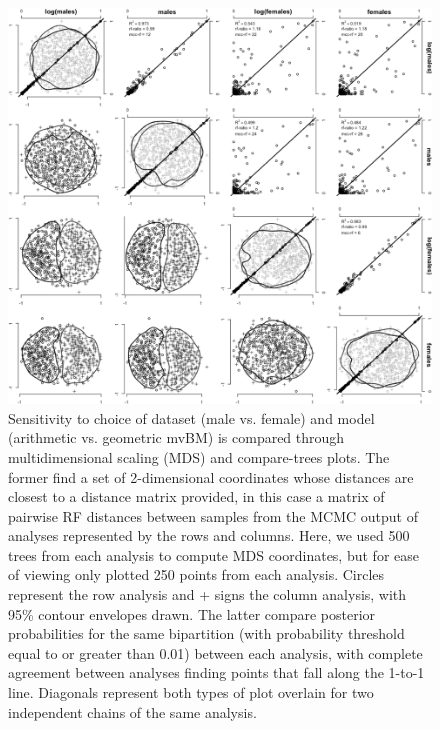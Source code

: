 \begin{figure}[h]
\centering
\includegraphics[width=140mm]{figures/sensitivityHowells.png}
\caption[Visualizing Sensitivity to Researcher Degrees of Freedom in Analysis of Howells' Data]{Sensitivity to choice of dataset (male vs. female) and model (arithmetic vs. geometric mvBM) is compared through multidimensional scaling (MDS) and compare-trees plots. The former find a set of 2-dimensional coordinates whose distances are closest to a distance matrix provided, in this case a matrix of pairwise RF distances between samples from the MCMC output of analyses represented by the rows and columns. Here, we used 500 trees from each analysis to compute MDS coordinates, but for ease of viewing only plotted 250 points from each analysis. Circles represent the row analysis and + signs the column analysis, with 95\% contour envelopes drawn. The latter compare posterior probabilities for the same bipartition (with probability threshold equal to or greater than 0.01) between each analysis, with complete agreement between analyses finding points that fall along the 1-to-1 line. Diagonals represent both types of plot overlain for two independent chains of the same analysis.\label{overflow}
\label{sensitivitySexGeom}
}
\end{figure}

